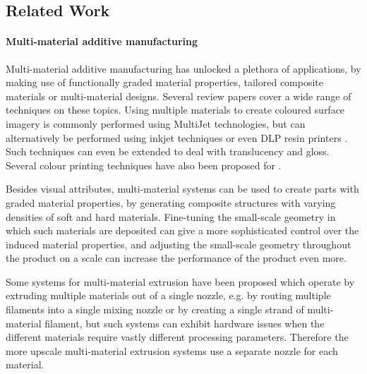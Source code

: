 \subsection{Related Work}\label{interlocking:sec:related_work}

\paragraph{Multi-material additive manufacturing}
Multi-material additive manufacturing has unlocked a plethora of applications, by making use of functionally graded material properties, tailored composite materials or multi-material designs.
Several review papers cover a wide range of techniques on these topics.\cite{Vaezi2013,Rafiee2020}
Using multiple materials to create coloured surface imagery is commonly performed using MultiJet technologies, but can alternatively be performed using inkjet techniques\cite{sachs1994three} or even DLP resin printers \cite{Zhou2011Development}.
Such techniques can even be extended to deal with translucency\cite{Brunton2018} and gloss\cite{elkhuizen2019gloss}.
Several colour printing techniques have also been proposed for .\cite{reiner2014dual,Song2019,Kuipers2018}

Besides visual attributes, multi-material systems can be used to create parts with graded material properties, by generating composite structures with varying densities of soft and hard materials.\cite{Cho2003851}
Fine-tuning the small-scale geometry in which such materials are deposited can give a more sophisticated control over the induced material properties,\cite{Leung2019,mirzaali2020}
and adjusting the small-scale geometry throughout the product on a  scale can increase the performance of the product even more.\cite{Zhu2017}

Some  systems for multi-material extrusion have been proposed which operate by extruding multiple materials out of a single nozzle, e.g. by routing multiple filaments into a single mixing nozzle\cite{diamondhotend} or by creating a single strand of multi-material filament\cite{Takahashi2020,Mosaic2015},
but such systems can exhibit hardware issues when the different materials require vastly different processing parameters.
Therefore the more upscale multi-material extrusion systems use a separate nozzle for each material.\cite{UltimakerS5}



